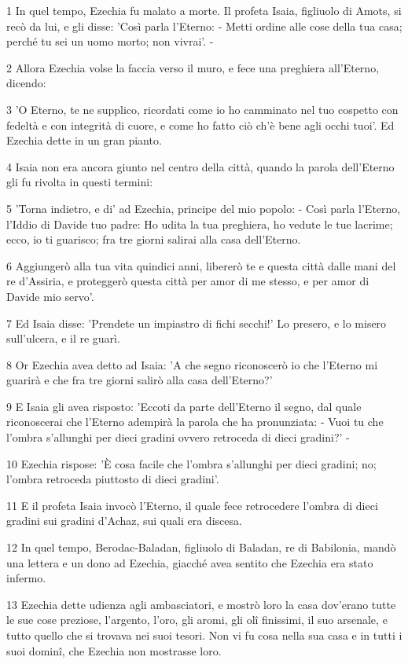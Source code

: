 \par 1 In quel tempo, Ezechia fu malato a morte. Il profeta Isaia, figliuolo di Amots, si recò da lui, e gli disse: 'Così parla l'Eterno: - Metti ordine alle cose della tua casa; perché tu sei un uomo morto; non vivrai'. -
\par 2 Allora Ezechia volse la faccia verso il muro, e fece una preghiera all'Eterno, dicendo:
\par 3 'O Eterno, te ne supplico, ricordati come io ho camminato nel tuo cospetto con fedeltà e con integrità di cuore, e come ho fatto ciò ch'è bene agli occhi tuoi'. Ed Ezechia dette in un gran pianto.
\par 4 Isaia non era ancora giunto nel centro della città, quando la parola dell'Eterno gli fu rivolta in questi termini:
\par 5 'Torna indietro, e di' ad Ezechia, principe del mio popolo: - Così parla l'Eterno, l'Iddio di Davide tuo padre: Ho udita la tua preghiera, ho vedute le tue lacrime; ecco, io ti guarisco; fra tre giorni salirai alla casa dell'Eterno.
\par 6 Aggiungerò alla tua vita quindici anni, libererò te e questa città dalle mani del re d'Assiria, e proteggerò questa città per amor di me stesso, e per amor di Davide mio servo'.
\par 7 Ed Isaia disse: 'Prendete un impiastro di fichi secchi!' Lo presero, e lo misero sull'ulcera, e il re guarì.
\par 8 Or Ezechia avea detto ad Isaia: 'A che segno riconoscerò io che l'Eterno mi guarirà e che fra tre giorni salirò alla casa dell'Eterno?'
\par 9 E Isaia gli avea risposto: 'Eccoti da parte dell'Eterno il segno, dal quale riconoscerai che l'Eterno adempirà la parola che ha pronunziata: - Vuoi tu che l'ombra s'allunghi per dieci gradini ovvero retroceda di dieci gradini?' -
\par 10 Ezechia rispose: 'È cosa facile che l'ombra s'allunghi per dieci gradini; no; l'ombra retroceda piuttosto di dieci gradini'.
\par 11 E il profeta Isaia invocò l'Eterno, il quale fece retrocedere l'ombra di dieci gradini sui gradini d'Achaz, sui quali era discesa.
\par 12 In quel tempo, Berodac-Baladan, figliuolo di Baladan, re di Babilonia, mandò una lettera e un dono ad Ezechia, giacché avea sentito che Ezechia era stato infermo.
\par 13 Ezechia dette udienza agli ambasciatori, e mostrò loro la casa dov'erano tutte le sue cose preziose, l'argento, l'oro, gli aromi, gli olî finissimi, il suo arsenale, e tutto quello che si trovava nei suoi tesori. Non vi fu cosa nella sua casa e in tutti i suoi dominî, che Ezechia non mostrasse loro.
